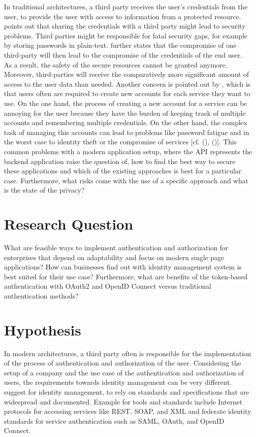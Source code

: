 In traditional architectures, a third party receives the user’s credentials from the user, to provide the user with access to information from a protected resource. \cite{Prasad:MMWPT} points out that sharing the credentials with a third party might lead to security problems. Third parties might be responsible for fatal security gaps, for example by storing passwords in plain-text. \cite{Prasad:MMWPT} further states that the compromise of one third-party will then lead to the compromise of the credentials of the end user. As a result, the safety of the secure resources cannot be granted anymore. Moreover, third-parties will receive the comparatively more significant amount of access to the user data than needed. Another concern is pointed out by \cite{Sakimura:OIDCC}, which is that users often are required to create new accounts for each service they want to use. On the one hand, the process of creating a new account for a service can be annoying for the user because they have the burden of keeping track of multiple accounts and remembering multiple credentials. On the other hand, the complex task of managing this accounts can lead to problems like password fatigue and in the worst case to identity theft or the compromise of services [cf. (\cite{Sakimura:OIDCC}), (\cite{Prasad:MMWPT})].
This common problems with a modern application setup, where the API represents the backend application raise the question of, how to find the best way to secure these applications and which of the existing approaches is best for a particular case. Furthermore, what risks come with the use of a specific approach and what is the state of the privacy? 


\section{Research Question}

What are feasible ways to implement authentication and authorization for enterprises that depend on adaptability and focus on modern single page applications? How can businesses find out with identity management system is best suited for their use case? Furthermore, what are benefits of the token-based authentication with OAuth2 and OpenID Connect versus traditional authentication methods? 

\section{Hypothesis}

In modern architectures, a third party often is responsible for the implementation of the process of authentication and authorization of the user. Considering the setup of a company and the use case of the authentication and authorization of users, the requirements towards identity management can be very different. \cite{NIST:2017:DIG} suggest for identity management, to rely on standards and specifications that are widespread and documented. Example for tools and standards include Internet protocols for accessing services like REST, SOAP, and XML and federate identity standards for service authentication such as SAML, OAuth, and OpenID Connect.

